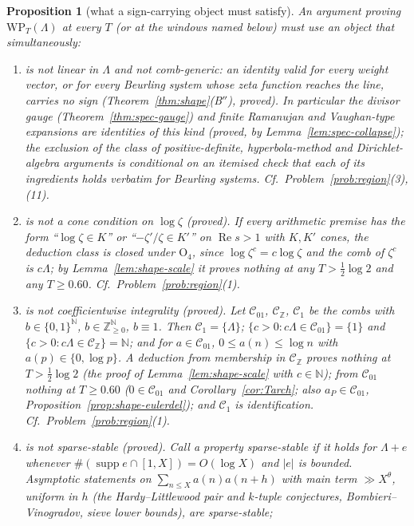 \documentclass[11pt]{amsart}
\newtheorem{proposition}[theorem]{Proposition}
\theoremstyle{definition}
\theoremstyle{remark}
\newcommand{\N}{\mathbb N}
\newcommand{\Z}{\mathbb Z}
\newcommand{\Rel}{\operatorname{Re}}
\newcommand{\supp}{\operatorname{supp}}
\begin{document}
\begin{proposition}[what a sign-carrying object must satisfy]\label{prop:spec}
An argument proving $\mathrm{WP}_T(\Lambda)$ at every $T$ (or at the windows named below) must use an object that simultaneously:
\begin{enumerate}
\item[(1)] is not linear in $\Lambda$ and not comb-generic: an identity valid for every weight vector, or for every Beurling system whose
zeta function reaches the line, carries no sign (Theorem~\ref{thm:shape}(B$''$), proved). In particular the divisor gauge
(Theorem~\ref{thm:spec-gauge}) and finite Ramanujan and Vaughan-type expansions are identities of this kind (proved, by
Lemma~\ref{lem:spec-collapse}); the exclusion of the class of positive-definite, hyperbola-method and Dirichlet-algebra arguments is
\emph{conditional} on an itemised check that each of its ingredients holds verbatim for Beurling systems. Cf.\ Problem~\ref{prob:region}(3),(11).
\item[(2)] is not a cone condition on $\log\zeta$ (proved). If every arithmetic premise has the form ``$\log\zeta\in K$'' or
``$-\zeta'/\zeta\in K'$'' on $\Rel s>1$ with $K,K'$ cones, the deduction class is closed under $\mathrm O_4$, since $\log\zeta^c=c\log\zeta$
and the comb of $\zeta^c$ is $c\Lambda$; by Lemma~\ref{lem:shape-scale} it proves nothing at any $T>\frac12\log2$ and any $T\ge0.60$.
Cf.\ Problem~\ref{prob:region}(1).
\item[(3)] is not coefficientwise integrality (proved). Let $\mathcal C_{01}$, $\mathcal C_\Z$, $\mathcal C_1$ be the combs with
$b\in\{0,1\}^\N$, $b\in\Z_{\ge0}^\N$, $b\equiv1$. Then $\mathcal C_1=\{\Lambda\}$; $\{c>0:c\Lambda\in\mathcal C_{01}\}=\{1\}$ and
$\{c>0:c\Lambda\in\mathcal C_\Z\}=\N$; and for $a\in\mathcal C_{01}$, $0\le a(n)\le\log n$ with $a(p)\in\{0,\log p\}$. A deduction from
membership in $\mathcal C_\Z$ proves nothing at $T>\frac12\log2$ (the proof of Lemma~\ref{lem:shape-scale} with $c\in\N$); from
$\mathcal C_{01}$ nothing at $T\ge0.60$ ($0\in\mathcal C_{01}$ and Corollary~\ref{cor:Tarch}; also $a_P\in\mathcal C_{01}$,
Proposition~\ref{prop:shape-eulerdel}); and $\mathcal C_1$ is identification. Cf.\ Problem~\ref{prob:region}(1).
\item[(4)] is not sparse-stable (proved). Call a property sparse-stable if it holds for $\Lambda+e$ whenever
$\#(\supp e\cap[1,X])=O(\log X)$ and $|e|$ is bounded. Asymptotic statements on $\sum_{n\le X}a(n)a(n+h)$ with main term $\gg X^\theta$,
uniform in $h$ (the Hardy--Littlewood pair and $k$-tuple conjectures, Bombieri--Vinogradov, sieve lower bounds), are sparse-stable;

\end{enumerate}
\end{proposition}
\end{document}
